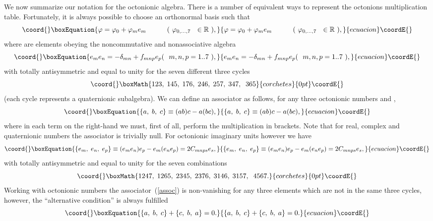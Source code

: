 \documentclass[a4paper,12pt]{book}
\begin{document}
We now summarize our notation for the octonionic algebra. There is a number
of equivalent ways to represent the octonions multiplication table.
Fortunately, it is always possible to choose an orthonormal basis \coordHE{} such that 
\begin{equation}\coord{}\boxEquation{
\varphi =\varphi _{0}+\varphi _{m}e_{m}\quad \quad \quad (~\varphi
_{0,...,7}~~\in \Bbb{R}~),
}{
\varphi =\varphi _{0}+\varphi _{m}e_{m}\quad \quad \quad (~\varphi
_{0,...,7}~~\in \Bbb{R}~),
}{ecuacion}\coordE{}\end{equation}
where \coordHE{} are elements obeying the noncommutative and nonassociative
algebra 
\begin{equation}\coord{}\boxEquation{
e_{m}e_{n}=-\delta _{mn}+f_{mnp}e_{p}(~{\ m,n,p=1..7}~),
}{
e_{m}e_{n}=-\delta _{mn}+f_{mnp}e_{p}(~{\ m,n,p=1..7}~),
}{ecuacion}\coordE{}\end{equation}
with \coordHE{} totally antisymmetric and equal to unity for the seven
different three cycles 
\[\coord{}\boxMath{
123,\;145,\;176,\;246,\;257,\;347,\;\;365 
}{corchetes}{0pt}\coordE{}\]
(each cycle represents a quaternionic subalgebra). We can define an
associator as follows, for any three octonionic numbers \coordHE{} and \coordHE{}, 
\begin{equation}\coord{}\boxEquation{
\{a,\;b,\;c\}\equiv (ab)c-a(bc),
}{
\{a,\;b,\;c\}\equiv (ab)c-a(bc),
}{ecuacion}\coordE{}\end{equation}
where in each term on the right-hand we must, first of all, perform the
multiplication in brackets. Note that for real, complex and quaternionic
numbers the associator is trivially null. For octonionic imaginary units
however we have 
\begin{equation}\coord{}\boxEquation{
\{e_{m},\;e_{n},\;e_{p}\}\equiv
(e_{m}e_{n})e_{p}-e_{m}(e_{n}e_{p})=2C_{mnps}e_{s},  \label{assoc}
}{
\{e_{m},\;e_{n},\;e_{p}\}\equiv
(e_{m}e_{n})e_{p}-e_{m}(e_{n}e_{p})=2C_{mnps}e_{s},  }{ecuacion}\coordE{}\end{equation}
with \coordHE{} totally antisymmetric and equal to unity for the seven
combinations 
\[\coord{}\boxMath{
1247,\;1265,\;2345,\;2376,\;3146,\;3157,\;\;4567. 
}{corchetes}{0pt}\coordE{}\]
Working with octonionic numbers the associator~(\ref{assoc}) is
non-vanishing for any three elements which are not in the same three cycles,
however, the ``alternative condition'' is always fulfilled 
\begin{equation}\coord{}\boxEquation{
\{a,\;b,\;c\}+\{c,\;b,\;a\}=0.  \label{rul}
}{
\{a,\;b,\;c\}+\{c,\;b,\;a\}=0.  }{ecuacion}\coordE{}\end{equation}
\end{document}
